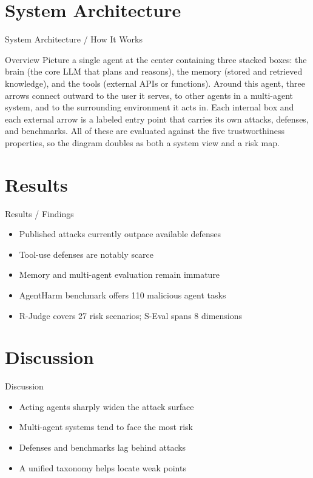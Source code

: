 \documentclass[10pt]{beamer}
\begin{document}
\section{System Architecture}
\begin{frame}{System Architecture / How It Works}
  \begin{block}{Overview}
  Picture a single agent at the center containing three stacked boxes: the brain (the core LLM that plans and reasons), the memory (stored and retrieved knowledge), and the tools (external APIs or functions). Around this agent, three arrows connect outward to the user it serves, to other agents in a multi-agent system, and to the surrounding environment it acts in. Each internal box and each external arrow is a labeled entry point that carries its own attacks, defenses, and benchmarks. All of these are evaluated against the five trustworthiness properties, so the diagram doubles as both a system view and a risk map.
  \end{block}
\end{frame}

\section{Results}
\begin{frame}[allowframebreaks]{Results / Findings}
\begin{itemize}
  \item Published attacks currently outpace available defenses
  \item Tool-use defenses are notably scarce
  \item Memory and multi-agent evaluation remain immature
  \item AgentHarm benchmark offers 110 malicious agent tasks
  \item R-Judge covers 27 risk scenarios; S-Eval spans 8 dimensions
\end{itemize}
\end{frame}

\section{Discussion}
\begin{frame}{Discussion}
\begin{itemize}
  \item Acting agents sharply widen the attack surface
  \item Multi-agent systems tend to face the most risk
  \item Defenses and benchmarks lag behind attacks
  \item A unified taxonomy helps locate weak points
\end{itemize}
\end{frame}
\end{document}
